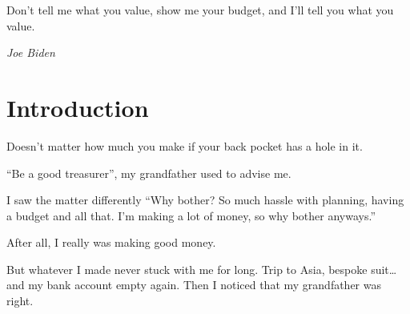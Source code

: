 \epigraph{Don't tell me what you value, show me your budget, and I'll tell you what you value.}{\textit{Joe Biden}}

\section*{Introduction}

Doesn't matter how much you make if your back pocket has a hole in it.

\enquote{Be a good treasurer}, my grandfather used to advise me.

I saw the matter differently \enquote{Why bother? So much hassle with planning, having a budget and all that. I'm making a lot of money, so why bother anyways.}

After all, I really was making good money.

But whatever I made never stuck with me for long. Trip to Asia, bespoke suit\dots and my bank account empty again. Then I noticed that my grandfather was right.